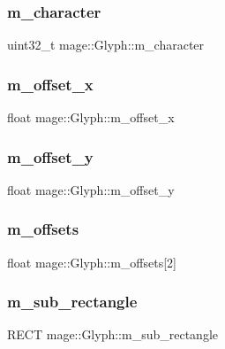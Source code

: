 \subsubsection{\texorpdfstring{m\+\_\+character}{m\_character}}
{\footnotesize\ttfamily uint32\+\_\+t mage\+::\+Glyph\+::m\+\_\+character}

\hypertarget{structmage_1_1_glyph_a13b8a2a17b96e317b5ae563668df7540}{}\label{structmage_1_1_glyph_a13b8a2a17b96e317b5ae563668df7540} 
\subsubsection{\texorpdfstring{m\+\_\+offset\+\_\+x}{m\_offset\_x}}
{\footnotesize\ttfamily float mage\+::\+Glyph\+::m\+\_\+offset\+\_\+x}

\hypertarget{structmage_1_1_glyph_ab3123f06cb1a27aaafa4fd6171a66a04}{}\label{structmage_1_1_glyph_ab3123f06cb1a27aaafa4fd6171a66a04} 
\subsubsection{\texorpdfstring{m\+\_\+offset\+\_\+y}{m\_offset\_y}}
{\footnotesize\ttfamily float mage\+::\+Glyph\+::m\+\_\+offset\+\_\+y}

\hypertarget{structmage_1_1_glyph_a0bd12df61a764922f6c9700f4b4a6a54}{}\label{structmage_1_1_glyph_a0bd12df61a764922f6c9700f4b4a6a54} 
\subsubsection{\texorpdfstring{m\+\_\+offsets}{m\_offsets}}
{\footnotesize\ttfamily float mage\+::\+Glyph\+::m\+\_\+offsets\mbox{[}2\mbox{]}}

\hypertarget{structmage_1_1_glyph_ac990dc92b5eebcc99da599f1a8d15bb4}{}\label{structmage_1_1_glyph_ac990dc92b5eebcc99da599f1a8d15bb4} 
\subsubsection{\texorpdfstring{m\+\_\+sub\+\_\+rectangle}{m\_sub\_rectangle}}
{\footnotesize\ttfamily R\+E\+CT mage\+::\+Glyph\+::m\+\_\+sub\+\_\+rectangle}

